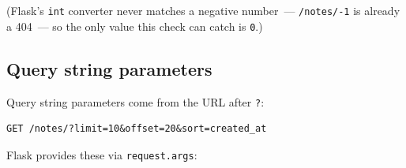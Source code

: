 \begin{codebox}[short]

\begin{Shaded}
\begin{Highlighting}[]
\NormalTok{(}\OperatorTok{=}\NormalTok{[}\NormalTok{])}
    \OperatorTok{\textless{}=} \NormalTok{:}
        \NormalTok{: }\NormalTok{\}), }
\end{Highlighting}
\end{Shaded}

\end{codebox}

\noindent{}(Flask's \texttt{int} converter never matches a negative number~--- \texttt{/notes/-1} is already a 404~--- so the only value this check can catch is \texttt{0}.)

\subsection*{Query string parameters}\label{31-input-handling:query-string-parameters}

Query string parameters come from the URL after \texttt{?}:

\begin{outputbox}[short]
\begin{Verbatim}[fontsize=\codesize, breaklines, breakanywhere, breaksymbolleft={\tiny\textcolor{muted}{$\hookrightarrow$}}]
GET /notes/?limit=10&offset=20&sort=created_at
\end{Verbatim}
\end{outputbox}

\noindent{}Flask provides these via \texttt{request.args}:

